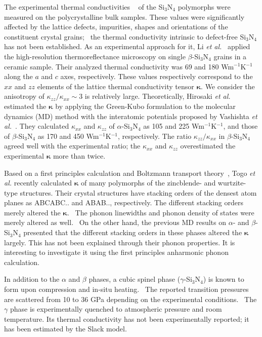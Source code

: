 \documentclass[twocolumn,amsmath,amssymb,a4paper,prb,superscriptaddress,floatfix]{revtex4-1}
\begin{document}
The experimental thermal conductivities
~\cite{zhou,hirao-rev,watari,hirosaki,hirai} of the Si$_3$N$_4$ polymorphs were
measured on the polycrystalline bulk samples. These values were significantly
affected by the lattice defects, impurities, shapes and orientations of the
constituent crystal grains;~\cite{hirosaki-md} the thermal conductivity
intrinsic to defect-free Si$_3$N$_4$ has not been established. As an
experimental approach for it, Li {\it et al.}~\cite{li} applied the
high-resolution thermoreflectance microscopy on single $\beta$-Si$_3$N$_4$
grains in a ceramic sample. Their analyzed thermal conductivity was 69 and 180
Wm$^{-1}$K$^{-1}$ along the $a$ and $c$ axes, respectively.  These values
respectively correspond to the $xx$ and $zz$ elements of the lattice thermal
conductivity tensor $\boldsymbol{\kappa}$. We consider the anisotropy of
$\kappa_{zz}/\kappa_{xx}\sim 3$ is relatively large.  Theoretically, Hirosaki
{\it et al.}~\cite{hirosaki-md} estimated the $\boldsymbol{\kappa}$ by applying
the Green-Kubo formulation to the molecular dynamics (MD) method with the
interatomic potentials proposed by Vashishta {\it et al.}~\cite{vashishta}.
They calculated $\kappa$$_{xx}$ and $\kappa$$_{zz}$ of $\alpha$-Si$_3$N$_4$ as
105 and 225 Wm$^{-1}$K$^{-1}$, and those of $\beta$-Si$_3$N$_4$ as 170 and 450
Wm$^{-1}$K$^{-1}$, respectively.  The ratio $\kappa_{zz}/\kappa_{xx}$ in
$\beta$-Si$_3$N$_4$ agreed well with the experimental ratio; the $\kappa_{xx}$
and $\kappa_{zz}$ overestimated the experimental $\boldsymbol{\kappa}$ more than
twice. 

Based on a first principles calculation and Boltzmann transport
theory~\cite{phono3py}, Togo {\it{et al.}} recently calculated
$\boldsymbol{\kappa}$ of many polymorphs of the zincblende- and wurtzite-type
structures. Their crystal structures have stacking orders of the densest atom
planes as ABCABC.. and ABAB.., respectively. The different stacking orders
merely altered the $\boldsymbol{\kappa}$.~\cite{phono3py} The phonon linewidths
and phonon density of states were merely altered as
well.~\cite{phono3py} On the other hand, the previous MD results on $\alpha$-
and $\beta$-Si$_3$N$_4$ presented that the different stacking orders in these
phases altered the $\boldsymbol{\kappa}$ largely. This has not been explained
through their phonon properties.  It is interesting to investigate it using the
first principles anharmonic phonon calculation.

In addition to the $\alpha$ and $\beta$ phases, a cubic spinel phase
($\gamma$-Si$_3$N$_4$) is known to form upon compression and in-situ
heating.~\cite{zerr,zhang} The reported transition pressures are scattered from
10 to 36 GPa depending on the experimental conditions.~\cite{xu}  The $\gamma$
phase is experimentally quenched to atmospheric pressure and room temperature.
Its thermal conductivity has not been experimentally reported; it has been
estimated by the Slack model.~\cite{morelli} 
\end{document}

